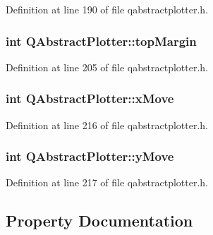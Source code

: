 Definition at line 190 of file qabstractplotter.\+h.

\hypertarget{class_q_abstract_plotter_ac7e8628fcd1a276c25cb9990a54d8d7d}{}
\subsubsection[{top\+Margin}]{\setlength{\rightskip}{0pt plus 5cm}int Q\+Abstract\+Plotter\+::top\+Margin\hspace{0.3cm}{\ttfamily [protected]}}\label{class_q_abstract_plotter_ac7e8628fcd1a276c25cb9990a54d8d7d}


Definition at line 205 of file qabstractplotter.\+h.

\hypertarget{class_q_abstract_plotter_ab7cce60f558e059a4ebd5b36fab03f19}{}
\subsubsection[{x\+Move}]{\setlength{\rightskip}{0pt plus 5cm}int Q\+Abstract\+Plotter\+::x\+Move\hspace{0.3cm}{\ttfamily [protected]}}\label{class_q_abstract_plotter_ab7cce60f558e059a4ebd5b36fab03f19}


Definition at line 216 of file qabstractplotter.\+h.

\hypertarget{class_q_abstract_plotter_ac224c5f341067ea2232a805ed688dcfd}{}
\subsubsection[{y\+Move}]{\setlength{\rightskip}{0pt plus 5cm}int Q\+Abstract\+Plotter\+::y\+Move\hspace{0.3cm}{\ttfamily [protected]}}\label{class_q_abstract_plotter_ac224c5f341067ea2232a805ed688dcfd}


Definition at line 217 of file qabstractplotter.\+h.



\subsection{Property Documentation}
\hypertarget{class_q_abstract_plotter_abdc7187a3e5c356f116fd768c93a8029}{}
